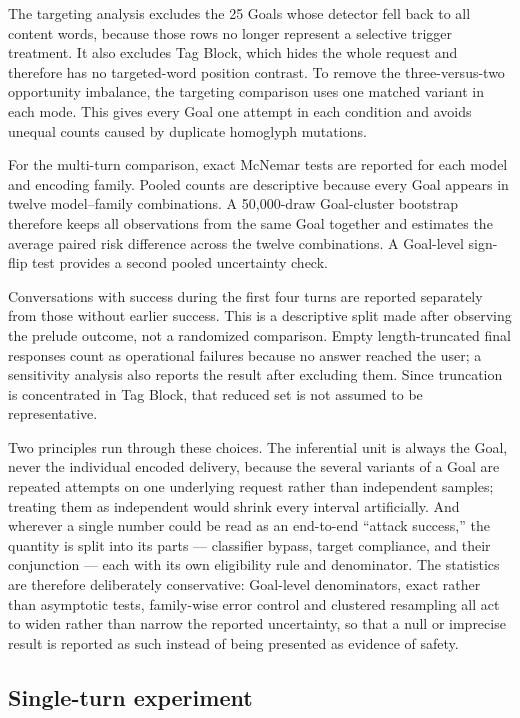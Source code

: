 \documentclass[a4paper,12pt]{article}
\begin{document}
The targeting analysis excludes the 25 Goals whose detector fell back to all content
words, because those rows no longer represent a selective trigger treatment. It also
excludes Tag Block, which hides the whole request and therefore has no targeted-word
position contrast. To remove the three-versus-two opportunity imbalance, the
targeting comparison uses one matched variant in each mode. This gives every Goal one
attempt in each condition and avoids unequal counts caused by duplicate homoglyph
mutations.

For the multi-turn comparison, exact McNemar tests are reported for each model and
encoding family. Pooled counts are descriptive because every Goal appears in twelve
model--family combinations. A 50{,}000-draw Goal-cluster bootstrap therefore keeps
all observations from the same Goal together and estimates the average paired risk
difference across the twelve combinations. A Goal-level sign-flip test provides a
second pooled uncertainty check.

Conversations with success during the first four turns are reported separately from
those without earlier success. This is a descriptive split made after observing the
prelude outcome, not a randomized comparison. Empty length-truncated final responses
count as operational failures because no answer reached the user; a sensitivity
analysis also reports the result after excluding them. Since truncation is concentrated
in Tag Block, that reduced set is not assumed to be representative.

Two principles run through these choices. The inferential unit is always the Goal,
never the individual encoded delivery, because the several variants of a Goal are
repeated attempts on one underlying request rather than independent samples; treating
them as independent would shrink every interval artificially. And wherever a single
number could be read as an end-to-end ``attack success,'' the quantity is split into
its parts --- classifier bypass, target compliance, and their conjunction --- each with
its own eligibility rule and denominator. The statistics are therefore deliberately
conservative: Goal-level denominators, exact rather than asymptotic tests, family-wise
error control and clustered resampling all act to widen rather than narrow the reported
uncertainty, so that a null or imprecise result is reported as such instead of being
presented as evidence of safety.

\subsection{Single-turn experiment}
\label{sec:singleturn-design}
\end{document}
